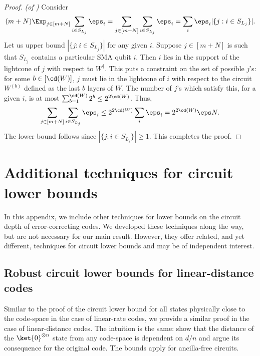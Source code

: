 \documentclass{toc}
\begin{document}
\begin{proof}\textit{(of )}
Consider
\begin{align}(m+N)\Exp_{j\in [m+N]}\sum_{i\in S_{L_j}}\eps_i=\sum_{j\in [m+N]}\sum_{i\in S_{L_j}}\eps_i=\sum_{i}\eps_i|\{j:i\in S_{L_j}\}|.\end{align}
Let us upper bound $|\{j:i\in S_{L_j}\}|$ for any given $i$. Suppose $j\in [m+N]$ is such that $S_{L_j}$ contains a particular SMA qubit $i$. Then $i$ lies in the support of the lightcone of $j$ with respect to $W^{\dagger}$. This puts a constraint on the set of possible $j$'s: for some $b \in [\cd(W)]$, $j$ must lie in the lightcone of $i$ with respect to the circuit $W^{(b)}$ defined as the last $b$ layers of $W$. The number of $j$'s which satisfy this, for a given $i$, is at most $\sum_{b=1}^{\cd(W)}2^{b}\leq 2^{2\cd(W)}$. Thus, 
\begin{align}\sum_{j\in [m+N]}\sum_{i\in S_{L_j}}\eps_i\leq 2^{2\cd(W)}\sum_{i}\eps_i=2^{2\cd(W)}\eps N.\end{align}
The lower bound follows since $|\{j:i\in S_{L_j}\}|\geq 1$. This completes the proof.
\end{proof}

%

\appendix

\section{Additional techniques for circuit lower bounds}
\label{sec:other-techniques}

In this appendix, we include other techniques for lower bounds on the circuit depth of error-correcting codes. We developed these techniques along the way, but are not necessary for our main result. However, they offer related, and yet different, techniques for circuit lower bounds and may be of independent interest.

\subsection{Robust circuit lower bounds for linear-distance codes}

%

Similar to the proof of the circuit lower bound for all states physically close to the code-space in the case of linear-rate codes, we provide a similar proof in the case of linear-distance codes. The intuition is the same: show that the distance of the $\ket{0}^{\otimes n}$ state from any code-space is dependent on $d/n$ and argue its consequence for the original code. The bounds apply for ancilla-free circuits.
%
\end{document}
